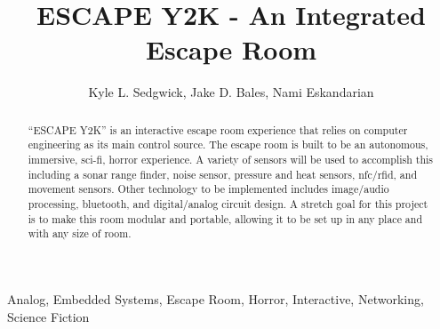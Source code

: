 \documentclass[conference]{IEEEtran}
\begin{document}
\title{ESCAPE Y2K - An Integrated Escape Room}

\author{Kyle L. Sedgwick, Jake D. Bales, Nami Eskandarian}

\author{
    \and
    \and
}



\maketitle

\begin{abstract}
    “ESCAPE Y2K” is an interactive escape room experience that relies on computer
    engineering as its main control source. The escape room is built to be an autonomous,
    immersive, sci-fi, horror experience. A variety of sensors will be used to accomplish this
    including a sonar range finder, noise sensor, pressure and heat sensors, nfc/rfid, and
    movement sensors. Other technology to be implemented includes image/audio processing,
    bluetooth, and digital/analog circuit design. A stretch goal for this project is to make this
    room modular and portable, allowing it to be set up in any place and with any size of room.
\end{abstract}

\begin{IEEEkeywords}
    Analog, Embedded Systems, Escape Room, Horror, Interactive, Networking, Science Fiction
\end{IEEEkeywords}
\end{document}
